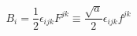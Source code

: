 \begin{equation}
B_i = \frac{1}{2} \epsilon_{ijk}F^{jk}
\equiv \frac{\sqrt{a}}{2} \epsilon_{ijk}f^{jk}
\label{eq44}
\end{equation}

